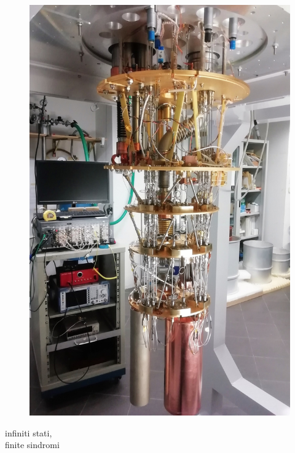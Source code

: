 \documentclass[aspectratio=169]{beamer}
\begin{document}
\begin{frame}
\begin{minipage}{0.32\textwidth}
\begin{figure}
			\includegraphics[scale=0.08]{quantistico.jpeg}
		\end{figure}
		infiniti stati, \\
		finite sindromi
	\end{minipage}

\end{frame}
\end{document}

